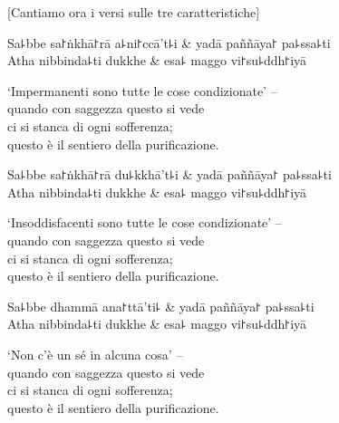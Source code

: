 \begin{english}
  [Cantiamo ora i versi sulle tre caratteristiche]
\end{english}

\begin{twochants}
  Sa꜕bbe sa꜓ṅkhā꜓rā a꜕ni꜓ccā't꜕i & yadā paññāya꜓ pa꜕ssa꜕ti \\
  Atha nibbinda꜕ti dukkhe & esa꜕ maggo vi꜓su꜕ddh꜓iyā \\
\end{twochants}

\begin{english}
  ‘Impermanenti sono tutte le cose condizionate’ –\\
  quando con saggezza questo si vede\\
  ci si stanca di ogni sofferenza;\\
  questo è il sentiero della purificazione.
\end{english}

\begin{twochants}
  Sa꜕bbe sa꜓ṅkhā꜓rā du꜕kkhā't꜕i & yadā paññāya꜓ pa꜕ssa꜕ti \\
  Atha nibbinda꜕ti dukkhe & esa꜕ maggo vi꜓su꜕ddh꜓iyā \\
\end{twochants}

\begin{english}
  ‘Insoddisfacenti sono tutte le cose condizionate’ –\\
  quando con saggezza questo si vede\\
  ci si stanca di ogni sofferenza;\\
  questo è il sentiero della purificazione.
\end{english}

\begin{twochants}
  Sa꜕bbe dhammā ana꜓ttā'ti꜕ & yadā paññāya꜓ pa꜕ssa꜕ti \\
  Atha nibbinda꜕ti dukkhe & esa꜕ maggo vi꜓su꜕ddh꜓iyā \\
\end{twochants}

\begin{english}
  ‘Non c'è un sé in alcuna cosa’ –\\
  quando con saggezza questo si vede\\
  ci si stanca di ogni sofferenza;\\
  questo è il sentiero della purificazione.
\end{english}

\clearpage

